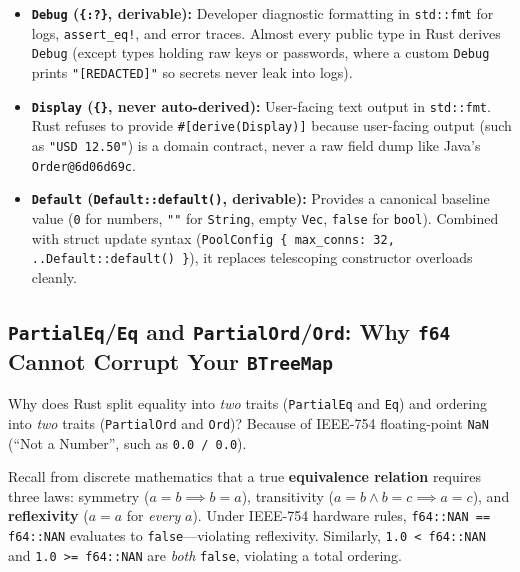 \begin{itemize}
  \item \textbf{\texttt{Debug} (\texttt{\{:?\}}, derivable):} Developer diagnostic formatting in \texttt{std::fmt} for logs, \texttt{assert\_eq!}, and error traces. Almost every public type in Rust derives \texttt{Debug} (except types holding raw keys or passwords, where a custom \texttt{Debug} prints \texttt{"[REDACTED]"} so secrets never leak into logs).
  \item \textbf{\texttt{Display} (\texttt{\{\}}, never auto-derived):} User-facing text output in \texttt{std::fmt}. Rust refuses to provide \texttt{\#[derive(Display)]} because user-facing output (such as \texttt{"USD 12.50"}) is a domain contract, never a raw field dump like Java's \texttt{Order@6d06d69c}.
  \item \textbf{\texttt{Default} (\texttt{Default::default()}, derivable):} Provides a canonical baseline value (\texttt{0} for numbers, \texttt{""} for \texttt{String}, empty \texttt{Vec}, \texttt{false} for \texttt{bool}). Combined with struct update syntax (\texttt{PoolConfig \{ max\_conns: 32, ..Default::default() \}}), it replaces telescoping constructor overloads cleanly.
\end{itemize}

\subsection{\texttt{PartialEq}/\texttt{Eq} and \texttt{PartialOrd}/\texttt{Ord}: Why \texttt{f64} Cannot Corrupt Your \texttt{BTreeMap}}

Why does Rust split equality into \emph{two} traits (\texttt{PartialEq} and \texttt{Eq}) and ordering into \emph{two} traits (\texttt{PartialOrd} and \texttt{Ord})? Because of IEEE-754 floating-point \texttt{NaN} (``Not a Number'', such as \texttt{0.0 / 0.0}).

Recall from discrete mathematics that a true \textbf{equivalence relation} requires three laws: symmetry ($a = b \implies b = a$), transitivity ($a = b \land b = c \implies a = c$), and \textbf{reflexivity} ($a = a$ for \emph{every} $a$). Under IEEE-754 hardware rules, \texttt{f64::NAN == f64::NAN} evaluates to \texttt{false}---violating reflexivity. Similarly, \texttt{1.0 < f64::NAN} and \texttt{1.0 >= f64::NAN} are \emph{both} \texttt{false}, violating a total ordering.

